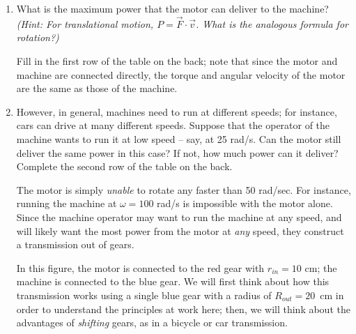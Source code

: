 \documentclass[12pt]{article}
\begin{document}
\begin{enumerate}

\item What is the maximum power that the motor can deliver to the machine? \textit{(Hint: For translational motion, $P = \vec F \cdot \vec v$. What is the analogous formula for rotation?)} 

Fill in the first row of the table on the back; note that since the motor and machine are connected directly, the torque and angular velocity of the motor are the same as those of the machine.
	
	
	\vspace{0.8in}
\item However, in general, machines need to run at different speeds; for instance, cars can drive at many different speeds. Suppose that the operator of the machine wants to run it at low speed -- say, at 25 rad/s. Can the motor still deliver the same power in this case? If not, how much power can it deliver? Complete the second row of the table on the back.
	
\vspace{1.5in}
\newpage



 The motor is simply {\it unable} to rotate any faster than 50 rad/sec. For instance, running the machine at $\omega = 100$ rad/s is impossible with the motor alone. Since the machine operator may want to run the machine at any speed, and will likely want the most power from the motor at {\it any} speed, they construct a transmission out of gears.
\medskip

\begin{minipage}{0.4\textwidth}
	
	In this figure, the motor is connected to the red gear with $r_{in}=10$ cm; the machine is connected to the blue gear. We will first think about how this transmission works using
	a single blue gear with a radius of $R_{out}=20$~cm in order to understand the principles at work here; then, we will think about the advantages of {\it shifting} gears,
	as in a bicycle or car transmission.
	

\end{minipage}
\end{enumerate}
\end{document}
